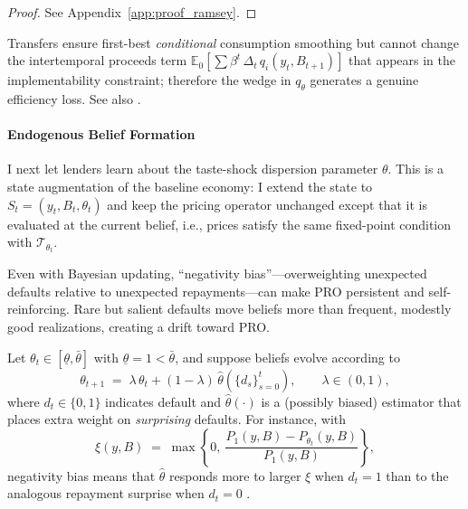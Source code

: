 \documentclass[12pt]{article}
\theoremstyle{plain}
\newcommand{\E}{\mathbb{E}}
\begin{document}
\begin{proof}
	See Appendix~\ref{app:proof_ramsey}.
\end{proof}

Transfers ensure first-best \emph{conditional} consumption smoothing but cannot
change the intertemporal proceeds term $\E_0[\sum
	\beta^t\,\Delta_t\,q_i(y_t,B_{t+1})]$ that appears in the implementability
constraint; therefore the wedge in $q_\theta$ generates a genuine efficiency
loss. See also \citet{AiyagariMarcetSargentSeppala2002}.

\paragraph{Endogenous Belief Formation}
I next let lenders learn about the taste-shock dispersion parameter $\theta$.
This is a state augmentation of the baseline economy: I extend the state to
$S_t=(y_t,B_t,\theta_t)$ and keep the pricing operator unchanged except that it
is evaluated at the current belief, i.e., prices satisfy the same fixed-point
condition with $\mathcal T_{\theta_t}$.

Even with Bayesian updating, ``negativity bias''---overweighting unexpected
defaults relative to unexpected repayments---can make PRO persistent and
self-reinforcing. Rare but salient defaults move beliefs more than frequent,
modestly good realizations, creating a drift toward PRO.

Let $\theta_t\in[\underline\theta,\bar\theta]$ with
$\underline\theta=1<\bar\theta$, and suppose beliefs evolve according to
\begin{equation}
	\theta_{t+1}\;=\; \lambda\,\theta_t + (1-\lambda)\,\widehat\theta(\{d_s\}_{s=0}^t),
	\qquad \lambda\in(0,1),
	\label{eq:belief_updating}
\end{equation}
where $d_t\in\{0,1\}$ indicates default and $\widehat\theta(\cdot)$ is a (possibly biased) estimator that places extra weight on \emph{surprising} defaults. For instance, with
\begin{equation}
	\xi(y,B)\;=\;\max\!\left\{0,\ \frac{P_1(y,B)-P_{\theta_t}(y,B)}{P_1(y,B)}\right\},
	\label{eq:surprise_intensity}
\end{equation}
negativity bias means that $\widehat\theta$ responds more to larger $\xi$ when $d_t=1$ than to the analogous repayment surprise when $d_t=0$  \citet{BaumeisterBratslavskyFinkenauer2001,BordaloGennaioliShleifer2018}.
\end{document}
